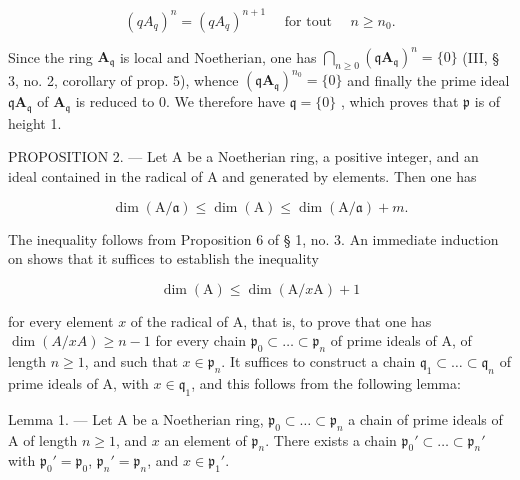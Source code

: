 \[
(q A _ {q}) ^ {n} = (q A _ {q}) ^ {n + 1} \quad \text { for   tout } \quad n \geqslant n _ {0}.\tag{3}
\]

Since the ring \(\mathbf{A}_{\mathfrak{q}}\) is local and Noetherian, one has \(\bigcap_{n\geqslant 0}(\mathfrak{q}\mathbf{A}_{\mathfrak{q}})^n = \{0\}\) (III, § 3, no. 2, corollary of prop. 5), whence \((\mathfrak{q}\mathbf{A}_{\mathfrak{q}})^{n_0} = \{0\}\) and finally the prime ideal \(\mathfrak{q}\mathbf{A}_{\mathfrak{q}}\) of \(\mathbf{A}_{\mathfrak{q}}\) is reduced to 0. We therefore have \(\mathfrak{q} = \{0\}\) , which proves that \(\mathfrak{p}\) is of height 1.

PROPOSITION 2. --- Let A be a Noetherian ring,  a positive integer, and  an ideal contained in the radical of A and generated by  elements. Then one has

\[
\dim (\mathrm{A} / \mathfrak {a}) \leqslant \dim (\mathrm{A}) \leqslant \dim (\mathrm{A} / \mathfrak {a}) + m.\tag{4}
\]

The inequality  follows from Proposition 6 of § 1, no. 3. An immediate induction on  shows that it suffices to establish the inequality

\[
\dim (\mathrm{A}) \leqslant \dim (\mathrm{A} / x \mathrm{A}) + 1\tag{5}
\]

for every element \(x\) of the radical of A, that is, to prove that one has \(\dim(A/xA) \geqslant n - 1\) for every chain \(\mathfrak{p}_0 \subset \ldots \subset \mathfrak{p}_n\) of prime ideals of A, of length \(n \geqslant 1\), and such that \(x \in \mathfrak{p}_n\). It suffices to construct a chain \(\mathfrak{q}_1 \subset \ldots \subset \mathfrak{q}_n\) of prime ideals of A, with \(x \in \mathfrak{q}_1\), and this follows from the following lemma:

Lemma 1. --- Let A be a Noetherian ring, \(\mathfrak{p}_{0} \subset \ldots \subset \mathfrak{p}_{n}\) a chain of prime ideals of A of length \(n \geqslant 1\), and \(x\) an element of \(\mathfrak{p}_{n}\). There exists a chain \(\mathfrak{p}_{0}' \subset \ldots \subset \mathfrak{p}_{n}'\) with \(\mathfrak{p}_{0}' = \mathfrak{p}_{0}\), \(\mathfrak{p}_{n}' = \mathfrak{p}_{n}\), and \(x \in \mathfrak{p}_{1}'\).

